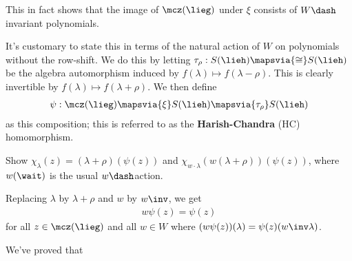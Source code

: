 This in fact shows that the image of \(\mcz(\lieg)\) under \(\xi\)
consists of \(W\dash\)invariant polynomials.

It's customary to state this in terms of the natural action of \(W\) on
polynomials without the row-shift. We do this by letting
\(\tau_\rho: S(\lieh) \mapsvia{\cong} S(\lieh)\) be the algebra
automorphism induced by \(f(\lambda) \mapsto f(\lambda - \rho)\). This
is clearly invertible by \(f(\lambda) \mapsto f(\lambda + \rho)\). We
then define
\begin{align*}\psi: \mcz(\lieg) \mapsvia{\xi} S(\lieh) \mapsvia{\tau_\rho} S(\lieh)\end{align*}
as this composition; this is referred to as the \textbf{Harish-Chandra}
(HC) homomorphism.

\begin{description}
\tightlist
\item[Exercise]
Show \(\chi_\lambda(z) = (\lambda + \rho) (\psi(z))\) and
\(\chi_{w\cdot \lambda} (w(\lambda+\rho))(\psi(z))\), where \(w(\wait)\)
is the usual \(w\dash\)action.
\end{description}

Replacing \(\lambda\) by \(\lambda + \rho\) and \(w\) by \(w\inv\), we
get
\begin{align*}
w\psi(z) = \psi(z)
\end{align*} for all \(z\in \mcz(\lieg)\) and all \(w\in W\) where
\((w\psi(z))(\lambda) = \psi(z)(w\inv \lambda)\).

We've proved that

